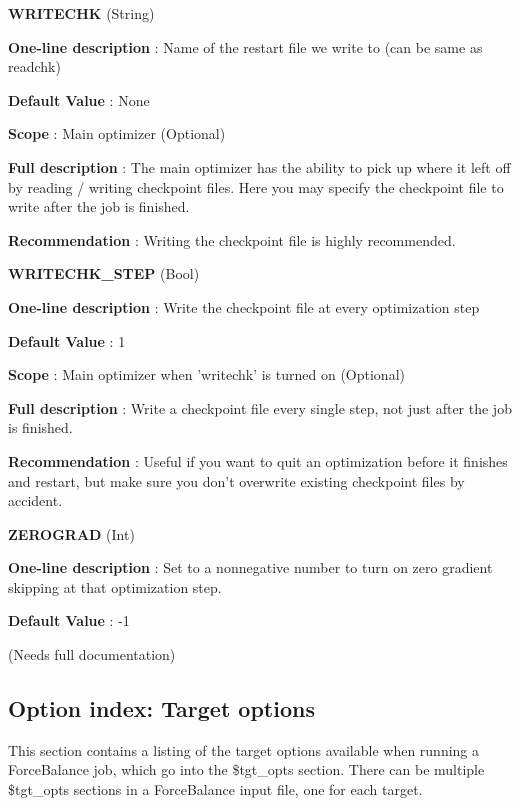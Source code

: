 \begin{DoxyItemize}
\item {\bfseries  W\-R\-I\-T\-E\-C\-H\-K } (String) \par
{\bfseries  One-\/line description }\-: Name of the restart file we write to (can be same as readchk) \par
{\bfseries  Default Value }\-: None \par
{\bfseries  Scope }\-: Main optimizer (Optional) \par
{\bfseries  Full description }\-: The main optimizer has the ability to pick up where it left off by reading / writing checkpoint files. Here you may specify the checkpoint file to write after the job is finished. \par
{\bfseries  Recommendation }\-: Writing the checkpoint file is highly recommended.\end{DoxyItemize}
\begin{DoxyItemize}
\item {\bfseries  W\-R\-I\-T\-E\-C\-H\-K\-\_\-\-S\-T\-E\-P } (Bool) \par
{\bfseries  One-\/line description }\-: Write the checkpoint file at every optimization step \par
{\bfseries  Default Value }\-: 1 \par
{\bfseries  Scope }\-: Main optimizer when 'writechk' is turned on (Optional) \par
{\bfseries  Full description }\-: Write a checkpoint file every single step, not just after the job is finished. \par
{\bfseries  Recommendation }\-: Useful if you want to quit an optimization before it finishes and restart, but make sure you don't overwrite existing checkpoint files by accident.\end{DoxyItemize}
\begin{DoxyItemize}
\item {\bfseries  Z\-E\-R\-O\-G\-R\-A\-D } (Int) \par
{\bfseries  One-\/line description }\-: Set to a nonnegative number to turn on zero gradient skipping at that optimization step. \par
{\bfseries  Default Value }\-: -\/1 \par
(Needs full documentation)\end{DoxyItemize}
\hypertarget{glossary_tgt_option_index}{}\subsection{Option index\-: Target options}\label{glossary_tgt_option_index}
This section contains a listing of the target options available when running a Force\-Balance job, which go into the \$tgt\-\_\-opts section. There can be multiple \$tgt\-\_\-opts sections in a Force\-Balance input file, one for each target.


